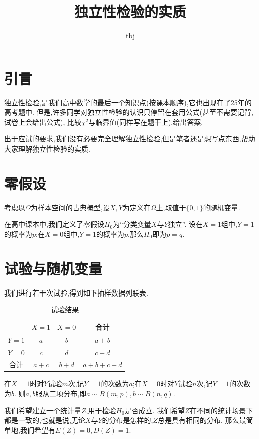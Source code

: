 \documentclass{article}
\title{独立性检验的实质}
\author{tbj}
\date{}
\begin{document}
\maketitle

\section{引言}

独立性检验,是我们高中数学的最后一个知识点(按课本顺序),它也出现在了25年的高考题中.
但是,许多同学对独立性检验的认识只停留在套用公式(甚至不需要记背,试卷上会给出公式),
比较$\chi^2$与临界值(同样写在题干上),给出答案.

出于应试的要求,我们没有必要完全理解独立性检验,但是笔者还是想写点东西,帮助大家理解独立性检验的实质.

\section{零假设}

考虑以$\Omega$为样本空间的古典概型,设$X, Y$为定义在$\Omega$上,取值于$\{ 0, 1 \}$的随机变量.

在高中课本中,我们定义了零假设$H_0$为``分类变量$X$与$Y$独立''.
设在$X = 1$组中,$Y = 1$的概率为$p$;在$X = 0$组中,$Y = 1$的概率为$p$,那么$H_0$即为$p = q$.

\section{试验与随机变量}

我们进行若干次试验,得到如下抽样数据列联表.

\begin{table}[ht]
\centering
\caption{试验结果}
\begin{tabular}{|c|c|c|c|}
    \hline
    & $X = 1$ & $X = 0$ & 合计 \\
    \hline
    $Y = 1$ & $a$ & $b$ & $a + b$ \\
    \hline
    $Y = 0$ & $c$ & $d$ & $c + d$ \\
    \hline
    合计 & $a + c$ & $b + d$ & $a + b + c + d$ \\
    \hline
\end{tabular}
\end{table}

在$X = 1$时对$Y$试验$m$次,记$Y = 1$的次数为$a$;在$X = 0$时对$Y$试验$n$次,记$Y = 1$的次数为$b$.
则$a, b$服从二项分布,即$a \sim B(m, p), b \sim B(n, q)$.

我们希望建立一个统计量$Z$,用于检验$H_0$是否成立.
我们希望$Z$在不同的统计场景下都是一致的,也就是说,无论$X$与$Y$的分布是怎样的,$Z$总是具有相同的分布.
那么最简单地,我们希望有$E(Z) = 0, D(Z) = 1$.
\end{document}
